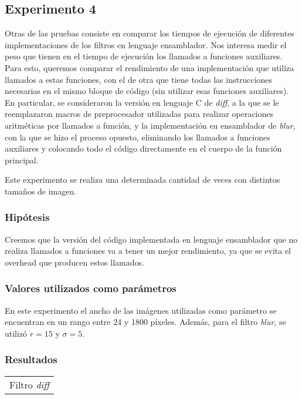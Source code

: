 	\subsection{Experimento 4}
		Otras de las pruebas consiste en comparar los tiempos de ejecución de diferentes implementaciones de los filtros en lenguaje ensamblador. Nos interesa medir el peso que tienen en el tiempo de ejecución los llamados a funciones auxiliares. Para esto, queremos comparar el rendimiento de una implementación que utiliza llamados a estas funciones, con el de otra que tiene todas las instrucciones necesarias en el mismo bloque de código (sin utilizar esas funciones auxiliares).
		En particular, se consideraron la versión en lenguaje C de \emph{diff}, a la que se le reemplazaron macros de preprocesador utilizadas para realizar operaciones aritméticas por llamados a función, y la implementación en ensamblador de \emph{blur}, con la que se hizo el proceso opuesto, eliminando los llamados a funciones auxiliares y colocando todo el código directamente en el cuerpo de la función principal.
		
		Este experimento se realiza una determinada cantidad de veces con distintos tamaños de imagen.

			\subsubsection*{Hipótesis} 
				Creemos que la versión del código implementada en lenguaje ensamblador que no realiza llamados a funciones va a tener un mejor rendimiento, ya que se evita el overhead que producen estos llamados.
		
			\subsubsection*{Valores utilizados como parámetros} 
				En este experimento el ancho de las imágenes utilizadas como parámetro se encuentran en un rango entre 24 y 1800 píxeles. Además, para el filtro \emph{blur}, se utilizó $r = 15$ y $\sigma = 5$.

			\subsubsection*{Resultados}
				{\centering \begin{tabular}{c}
		      		{\small Filtro \emph{diff}} \\
		    	\end{tabular}}

